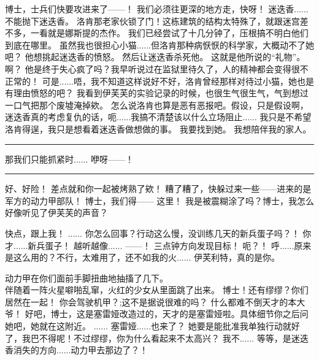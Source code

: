 \documentclass[openany]{book}
\begin{document}
\begin{dialogue}
     博士，士兵们快要攻进来了——！
     我们必须往更深的地方走，快呀！
     迷迭香......不能抛下迷迭香。
     洛肯那老家伙锁了门！这栋建筑的结构太特殊了，就跟迷宫差不多，一看就是娜斯提的杰作。
     我们已经尝试了十几分钟了，压根搞不明白他们到底在哪里。
     虽然我也很担心小猫......但洛肯那种病恹恹的科学家，大概动不了她吧？
     他想挑起迷迭香的愤怒。
     然后让迷迭香杀死他。
     这就是他所说的“礼物”。
     啊？
     他是终于失心疯了吗？我早听说过在监狱里待久了，人的精神都会变得很不正常的！
     可是......唔，我不知道这样说好不好，洛肯曾经那样对待过小猫，她也是有理由愤怒的吧？
     我看到伊芙芙的实验记录的时候，也很生气很生气，气到想过一口气把那个废墟淹掉欸。
     怎么说洛肯也算是恶有恶报吧。假设，只是假设啊，迷迭香真的考虑复仇的话，呃......我搞不清楚该以什么立场阻止......
     我只是不希望洛肯得逞，我只是想看着迷迭香做想做的事。
     我要找到她。
     我想陪伴我的家人。
    \par\noindent\rule{\textwidth}{0.4pt}
     那我们只能抓紧时......
     咿呀——！
    \par\noindent\rule{\textwidth}{0.4pt}
     好、好险！
     差点就和你一起被烤熟了欸！
     糟了糟了，快躲过来一些——进来的是军方的动力甲部队！
     博士，我们得——
     这里！
     我是被震糊涂了吗？博士，我怎么好像听见了伊芙芙的声音？
\end{dialogue}

\begin{dialogue}
     快点，跟上我！
     ......
     你怎么回事？行动这么慢，没训练几天的新兵蛋子吗？！
     你才......新兵蛋子！
     越听越像......
     ——！
     三点钟方向发现目标！
     呃？！
     呼......原来是这么用的？不行，太难用了，还不如我的火......
     伊芙利特，真的是你。\par
    动力甲在你们面前手脚扭曲地抽搐了几下。\\
    伴随着一阵火星噼啪乱窜，火红的少女从里面跳了出来。
     博士！还有缪缪？你们居然在一起！
     你会驾驶机甲？;这不是据说很难的吗？
     什么都难不倒天才的本大爷！
     好吧，博士，这是塞雷娅改造过的，天才的是塞雷娅啦。具体细节你之后问她吧，她就在这附近。
     ......
     塞雷娅......也来了？
     她要是能批准我单独行动就好了，我巴不得呢！不过缪缪，你为什么看起来不太高兴？
     我不......
     等等，是迷迭香消失的方向......动力甲去那边了？！
\end{dialogue}
\end{document}

